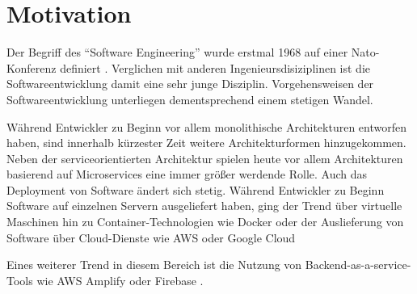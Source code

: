 \section{Motivation}

Der Begriff des "`Software Engineering"' wurde erstmal 1968 auf einer Nato-Konferenz definiert \autocite{naur1969software}. Verglichen mit anderen Ingenieursdisiziplinen ist die Softwareentwicklung damit eine sehr junge Disziplin. Vorgehensweisen der Softwareentwicklung unterliegen dementsprechend einem stetigen Wandel.

Während Entwickler zu Beginn vor allem monolithische Architekturen entworfen haben, sind innerhalb kürzester Zeit weitere Architekturformen hinzugekommen. Neben der serviceorientierten Architektur spielen heute vor allem Architekturen basierend auf Microservices eine immer größer werdende Rolle. Auch das Deployment von Software ändert sich stetig. Während Entwickler zu Beginn Software auf einzelnen Servern ausgeliefert haben, ging der Trend über virtuelle Maschinen hin zu Container-Technologien wie Docker oder der Auslieferung von Software über Cloud-Dienste wie \ac{AWS} oder Google Cloud

Eines weiterer Trend in diesem Bereich ist die Nutzung von Backend-as-a-service-Tools wie \ac{AWS} Amplify oder Firebase \autocite{villamizar2017cost}.